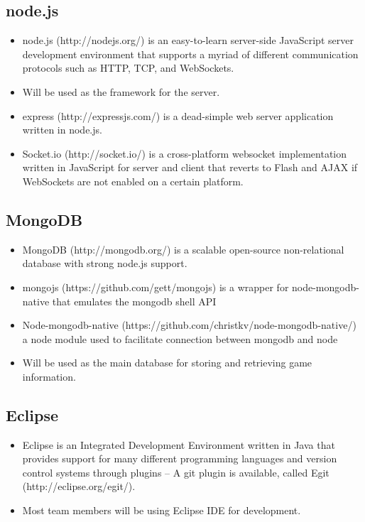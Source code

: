 \documentclass[letterpaper,12pt]{article}
\begin{document}
\subsection{node.js}
	\begin{itemize}
		\item node.js (http://nodejs.org/) is an easy-to-learn server-side JavaScript server development environment that supports a myriad of different communication protocols such as HTTP, TCP, and WebSockets.
		\item Will be used as the framework for the server.
		\item express (http://expressjs.com/) is a dead-simple web server application written in node.js.
		\item Socket.io (http://socket.io/) is a cross-platform websocket implementation written in JavaScript for server and client that reverts to Flash and AJAX if WebSockets are not enabled on a certain platform.
	\end{itemize}
\subsection{MongoDB}
	\begin{itemize}
		\item MongoDB (http://mongodb.org/) is a scalable open-source non-relational database with strong node.js support.
		\item mongojs (https://github.com/gett/mongojs) is a wrapper for node-mongodb-native that emulates the mongodb shell API
		\item Node-mongodb-native (https://github.com/christkv/node-mongodb-native/) a node module used to facilitate connection between mongodb and node
		\item Will be used as the main database for storing and retrieving game information.
	\end{itemize}

\subsection{Eclipse}
	\begin{itemize}
		\item Eclipse is an Integrated Development Environment written in Java that provides support for many different programming languages and version control systems through plugins -- A git plugin is available, called Egit (http://eclipse.org/egit/).
		\item Most team members will be using Eclipse IDE for development.
	\end{itemize}
\end{document}
